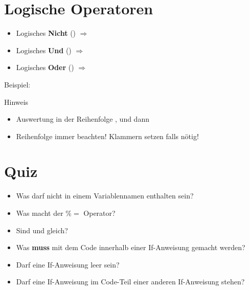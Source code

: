 \livecoding

\section{Logische Operatoren}
\begin{frame}
	\slidehead

	\begin{itemize}
		\item Logisches \textbf{Nicht} ()  $\Rightarrow$ 
		\item Logisches \textbf{Und} () $\Rightarrow$ 
		\item Logisches \textbf{Oder} ()  $\Rightarrow$ 
	\end{itemize}

	\begin{block}{Beispiel:}
	\end{block}
	\begin{block}{Hinweis}
		\begin{itemize}
			\item Auswertung in der Reihenfolge ,  und dann 
			\item Reihenfolge immer beachten! Klammern setzen falls nötig!
		\end{itemize}


	\end{block}
\end{frame}

\livecoding

\section{Quiz}
\begin{frame}
	\slidehead

	\begin{itemize}
		\item Was darf nicht in einem Variablennamen enthalten sein?
		\pause
		\item Was macht der \textbf{$\%=$} Operator?%
		\pause
		\item Sind \pythoninline{=} und \pythoninline{==} gleich?
		\pause
		\item Was \textbf{muss} mit dem Code innerhalb einer If-Anweisung gemacht werden?
		\pause
		\item Darf eine If-Anweisung leer sein?
		\pause
		\item Darf eine If-Anweisung im Code-Teil einer anderen If-Anweisung stehen?
	\end{itemize}
\end{frame}


